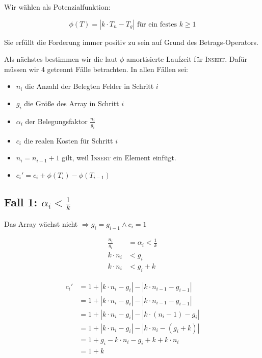 \documentclass[parskip=half,a4paper]{scrartcl}
\begin{document}
Wir wählen als Potenzialfunktion:

\begin{equation}
    \phi(T) = \left|k \cdot T_n - T_g\right| \text{ für ein festes $k \ge 1$}
\end{equation}

Sie erfüllt die Forderung immer positiv zu sein auf Grund des Betrags-Operators.

Als nächstes bestimmen wir die laut $\phi$ amortisierte Laufzeit für \textsc{Insert}. Dafür müssen wir 4 getrennt Fälle betrachten. In allen Fällen sei:

\begin{itemize}
    \item $n_i$ die Anzahl der Belegten Felder in Schritt $i$
    \item $g_i$ die Größe des Array in Schritt $i$
    \item $\alpha_i$ der Belegungsfaktor $\frac{n_i}{g_i}$
    \item $c_i$ die realen Kosten für Schritt $i$
    \item $n_i = n_{i-1} + 1$ gilt, weil \textsc{Insert} ein Element einfügt.
    \item $c_i' = c_i + \phi(T_i) - \phi(T_{i-1})$
\end{itemize}

\subsection*{Fall 1: $\alpha_i < \frac{1}{k}$}

Das Array wächst nicht
$\Rightarrow g_i = g_{i-1} \land c_i = 1$

\begin{equation}
\begin{aligned}
\frac{n_i}{g_i} &= \alpha_i < \frac{1}{k} \\
k \cdot n_i &< g_i\\
k \cdot n_i &< g_i + k
\end{aligned}
\end{equation}

\begin{equation}
\begin{aligned}
   c_i' &= 1 + \left|k \cdot n_i - g_i\right| - \left|k \cdot n_{i-1} - g_{i-1}\right|\\
   &= 1 + \left|k \cdot n_i - g_i\right| - \left|k \cdot n_{i-1} - g_{i-1}\right|\\
   &= 1 + \left|k \cdot n_i - g_i\right| - \left|k \cdot  (n_{i}-1) - g_{i}\right|\\
   &= 1 + \left|k \cdot n_i - g_i\right| - \left|k \cdot n_{i} - (g_{i} + k)\right|\\
   &= 1 + g_i - k \cdot n_i - g_i + k + k \cdot n_i\\
   &= 1 + k
\end{aligned}
\end{equation}
\end{document}
